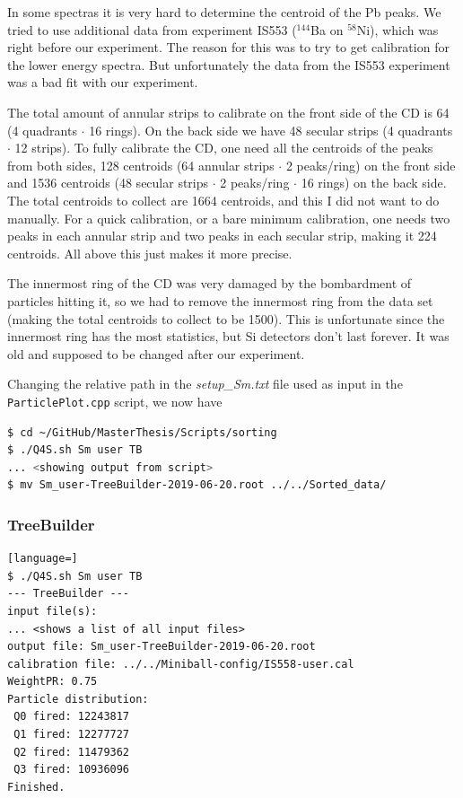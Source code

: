 \documentclass[twoside,english]{uiofysmaster/uiofysmaster}
\begin{document}
In some spectras it is very hard to determine the centroid of the Pb peaks. 
We tried to use additional data from experiment IS553 ($^{144}$Ba on $^{58}$Ni), which was right before our experiment. 
The reason for this was to try to get calibration for the lower energy spectra. 
But unfortunately the data from the IS553 experiment was a bad fit with our experiment. 

The total amount of annular strips to calibrate on the front side of the CD is 64 (4 quadrants $\cdot$ 16 rings). 
On the back side we have 48 secular strips (4 quadrants $\cdot$ 12 strips). 
To fully calibrate the CD, one need all the centroids of the peaks from both sides, 128 centroids (64 annular strips $\cdot$ 2 peaks/ring) on the front side and 1536 centroids (48 secular strips $\cdot$ 2 peaks/ring $\cdot$ 16 rings) on the back side. 
The total centroids to collect are 1664 centroids, and this I did not want to do manually.
For a quick calibration, or a bare minimum calibration, one needs two peaks in each annular strip and two peaks in each secular strip, making it 224 centroids.
All above this just makes it more precise.

The innermost ring of the CD was very damaged by the bombardment of particles hitting it, so we had to remove the innermost ring from the data set (making the total centroids to collect to be 1500). 
This is unfortunate since the innermost ring has the most statistics, but Si detectors don't last forever. 
It was old and supposed to be changed after our experiment. 



Changing the relative path in the \textit{setup\_Sm.txt} file used as input in the \texttt{ParticlePlot.cpp} script, we now have


\begin{lstlisting}[language=sh]
$ cd ~/GitHub/MasterThesis/Scripts/sorting 
$ ./Q4S.sh Sm user TB
... <showing output from script>
$ mv Sm_user-TreeBuilder-2019-06-20.root ../../Sorted_data/
\end{lstlisting}



\subsubsection*{TreeBuilder}
\begin{lstlisting}[language=]
$ ./Q4S.sh Sm user TB
--- TreeBuilder ---
input file(s):
... <shows a list of all input files>
output file: Sm_user-TreeBuilder-2019-06-20.root
calibration file: ../../Miniball-config/IS558-user.cal
WeightPR: 0.75
Particle distribution:
 Q0 fired: 12243817
 Q1 fired: 12277727
 Q2 fired: 11479362
 Q3 fired: 10936096
Finished.
\end{lstlisting}
\end{document}
